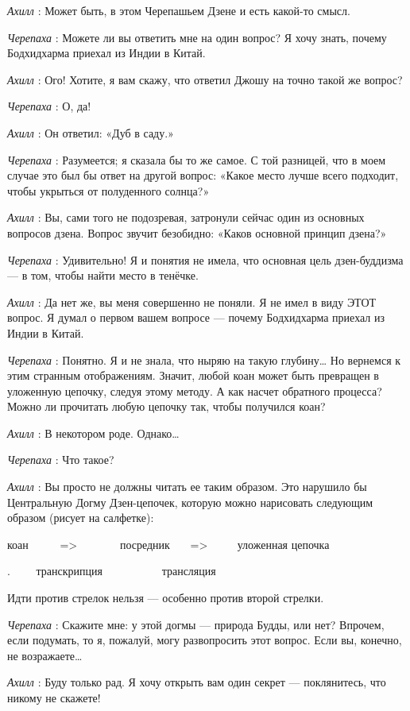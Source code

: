 \emph{Ахилл} : Может быть, в этом Черепашьем Дзене и есть какой-то смысл.

\emph{Черепаха} : Можете ли вы ответить мне на один вопрос? Я хочу знать, почему Бодхидхарма приехал из Индии в Китай.

\emph{Ахилл} : Ого! Хотите, я вам скажу, что ответил Джошу на точно такой же вопрос?

\emph{Черепаха} : О, да!

\emph{Ахилл} : Он ответил: «Дуб в саду.»

\emph{Черепаха} : Разумеется; я сказала бы то же самое. С той разницей, что в моем случае это был бы ответ на другой вопрос: «Какое место лучше всего подходит, чтобы укрыться от полуденного солнца?»

\emph{Ахилл} : Вы, сами того не подозревая, затронули сейчас один из основных вопросов дзена. Вопрос звучит безобидно: «Каков основной принцип дзена?»

\emph{Черепаха} : Удивительно! Я и понятия не имела, что основная цель дзен-буддизма --- в том, чтобы найти место в тенёчке.

\emph{Ахилл} : Да нет же, вы меня совершенно не поняли. Я не имел в виду ЭТОТ вопрос. Я думал о первом вашем вопросе --- почему Бодхидхарма приехал из Индии в Китай.

\emph{Черепаха} : Понятно. Я и не знала, что ныряю на такую глубину\ldots{} Но вернемся к этим странным отображениям. Значит, любой коан может быть превращен в уложенную цепочку, следуя этому методу. А как насчет обратного процесса? Можно ли прочитать любую цепочку так, чтобы получился коан?

\emph{Ахилл} : В некотором роде. Однако\ldots{}

\emph{Черепаха} : Что такое?

\emph{Ахилл} : Вы просто не должны читать ее таким образом. Это нарушило бы Центральную Догму Дзен-цепочек, которую можно нарисовать следующим образом (рисует на салфетке):

коан~~~~ ~=\textgreater~~~~~~ ~посредник~~~ =\textgreater~~~ ~ уложенная цепочка

.~~~~ транскрипция~~~~~~~~~ ~трансляция

Идти против стрелок нельзя --- особенно против второй стрелки.

\emph{Черепаха} : Скажите мне: у этой догмы --- природа Будды, или нет? Впрочем, если подумать, то я, пожалуй, могу развопросить этот вопрос. Если вы, конечно, не возражаете\ldots{}

\emph{Ахилл} : Буду только рад. Я хочу открыть вам один секрет --- поклянитесь, что никому не скажете!


